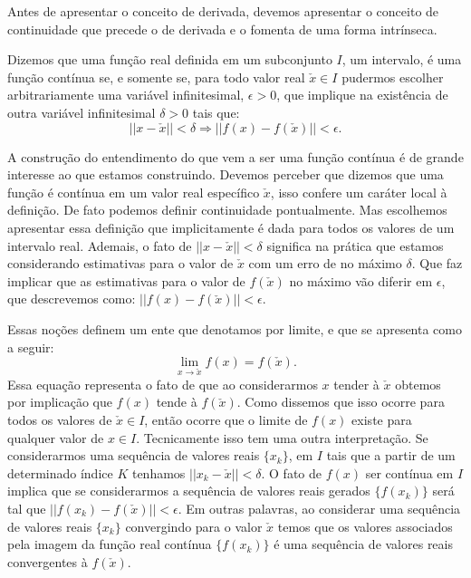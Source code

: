 \par Antes de apresentar o conceito de derivada, devemos apresentar o conceito de continuidade que precede o de derivada e o fomenta de uma forma intrínseca. 

\begin{definition}
  Dizemos que uma função real definida em um subconjunto $I$, um intervalo, é uma função contínua se, e somente se, para todo valor real $\check{x} \in I$ pudermos escolher arbitrariamente uma variável infinitesimal, $\epsilon > 0$, que implique na existência de outra variável infinitesimal $\delta>0$ tais que:
  $$||x - \check{x}|| < \delta \Rightarrow ||f(x) - f(\check{x})|| < \epsilon.$$ 
\end{definition}

\par A construção do entendimento do que vem a ser uma função contínua é de grande interesse ao que estamos construindo. Devemos perceber que dizemos que uma função é contínua em um valor real específico $\check{x}$, isso confere um caráter local à definição. De fato podemos definir continuidade pontualmente. Mas escolhemos apresentar essa definição que implicitamente é dada para todos os valores de um intervalo real. Ademais, o fato de $||x - \check{x}|| < \delta$ significa na prática que estamos considerando estimativas para o valor de $\check{x}$ com um erro de no máximo $\delta$. Que faz implicar que as estimativas para o valor de $f(\check{x})$ no máximo vão diferir em $\epsilon$, que descrevemos como: $||f(x) - f(\check{x})|| < \epsilon$.

\par Essas noções definem um ente que denotamos por limite, e que se apresenta como a seguir:
$$\lim_{x \rightarrow \check{x}}f(x)= f(\check{x}).$$
Essa equação representa o fato de que ao considerarmos $x$ tender à $\check{x}$ obtemos por implicação que $f(x)$ tende à $f(\check{x})$. Como dissemos que isso ocorre para todos os valores de $\check{x} \in I$, então ocorre que o limite de $f(x)$ existe para qualquer valor de $x \in I$. Tecnicamente isso tem uma outra interpretação. Se considerarmos uma sequência de valores reais $\{x_k\}$, em $I$ tais que a partir de um determinado índice $K$ tenhamos $||x_k - \check{x}|| < \delta$. O fato de $f(x)$ ser contínua em $I$ implica que se considerarmos a sequência de valores reais gerados $\{f(x_k)\}$ será tal que $||f(x_k) - f(\check{x})|| < \epsilon$. Em outras palavras, ao considerar uma sequência de valores reais $\{x_k\}$ convergindo para o valor $\check{x}$ temos que os valores associados pela imagem da função real contínua $\{f(x_k)\}$ é uma sequência de valores reais convergentes à $f(\check{x})$.

